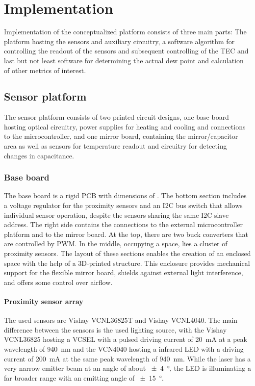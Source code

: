 
\chapter{Implementation}\label{c:implementation}
Implementation of the conceptualized platform consists of three main parts: The platform hosting the sensors and auxiliary circuitry, a software algorithm for controlling the readout of the sensors and subsequent controlling of the TEC and last but not least software for determining the actual dew point and calculation of other metrics of interest.

\section{Sensor platform}
The sensor platform consists of two printed circuit designs, one base board hosting optical circuitry, power supplies for heating and cooling and connections to the microcontroller, and one mirror board, containing the mirror/capacitor area as well as sensors for temperature readout and circuitry for detecting changes in capacitance.

\subsection{Base board}
The base board is a rigid PCB with dimensions of . The bottom section includes a voltage regulator for the proximity sensors and an \gls{I2C} bus switch that allows individual sensor operation, despite the sensors sharing the same \gls{I2C} slave address. The right side contains the connections to the external microcontroller platform and to the mirror board. At the top, there are two buck converters that are controlled by \gls{PWM}. In the middle, occupying a  space, lies a cluster of proximity sensors. The layout of these sections enables the creation of an enclosed space with the help of a 3D-printed structure. This enclosure provides mechanical support for the flexible mirror board, shields against external light interference, and offers some control over airflow.

\subsubsection{Proximity sensor array}
The used sensors are Vishay VCNL36825T and Vishay VCNL4040. The main difference between the sensors is the used lighting source, with the Vishay VCNL36825 hosting a \gls{VCSEL} with a pulsed driving current of \qty{20}{\mA} at a peak wavelength of \qty{940}{\nm} and the VCN4040 hosting a infrared \gls{LED} with a driving current of \qty{200}{\mA} at the same peak wavelength of \qty{940}{\nm}. While the laser has a very narrow emitter beam at an angle of about \qty{\pm 4}{\degree}, the \gls{LED} is illuminating a far broader range with an emitting angle of \qty{\pm 15}{\degree}. 

